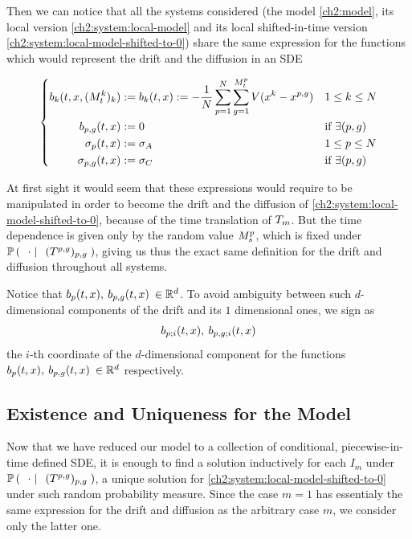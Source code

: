 Then we can notice that all the systems considered (the model \ref{ch2:model}, its local version \ref{ch2:system:local-model} and its local shifted-in-time version \ref{ch2:system:local-model-shifted-to-0}) share the same expression for the functions which would represent the drift and the diffusion in an SDE

\begin{equation}
\left\{
\begin{aligned}
b_k(t,x, (M^k_t)_k) &:= b_k(t,x) := - \frac{1}{N} \sum _{p = 1}^{N} \sum_{g = 1}^{M_t^p} V(x^k - x^{p,g})
	&& 1\leq k \leq N
\\
b_{p,g}(t,x) &:= 0
	&& \text{if } \exists (p,g)
\\
\sigma_p(t,x) &:= \sigma_A
	&& 1\leq p \leq N
\\
\sigma_{p,g}(t,x) &:= \sigma_C
	&& \text{if } \exists (p,g)
\end{aligned}
\right.
\end{equation}\label{ch2:def:drift-&-diffusion}

At first sight it would seem that these expressions would require to be manipulated in order to become the drift and the diffusion of \ref{ch2:system:local-model-shifted-to-0}, because of the time translation of $T_m$.
But the time dependence is given only by the random value $M_s^p$, which is fixed under $\mathbb{P} \left( \; \left. \; \cdot \; \right| \; \;(T^{p,g})_{p,g}  \; \right)$, giving us thus the exact same definition for the drift and diffusion throughout all systems.

\begin{remark}\label{ch2:rmk:notation-indices-drift}
	Notice that $b_p(t,x),\: b_{p,g}(t,x)\:\in \mathbb{R}^d$.
	To avoid ambiguity between such $d$-dimensional components of the drift and its $1$ dimensional ones, we sign as 
	\begin{equation*}
		b_{p;i}(t,x),\: b_{p,g;i}(t,x)
	\end{equation*}
	the $i$-th coordinate of the $d$-dimensional component for the functions $b_p(t,x),\: b_{p,g}(t,x)\:\in \mathbb{R}^d$ respectively.
\end{remark}

\subsection{Existence and Uniqueness for the Model}

Now that we have reduced our model to a collection of conditional, piecewise-in-time defined SDE, it is enough to find a solution inductively for each $I_m$ under $\mathbb{P} \left( \; \left. \; \cdot \; \right| \; \;(T^{p,g})_{p,g}  \; \right)$, \ie a unique solution for \ref{ch2:system:local-model-shifted-to-0} under such random probability measure.
Since the case $m=1$ has essentialy the same expression for the drift and diffusion as the arbitrary case $m$, we consider only the latter one.

